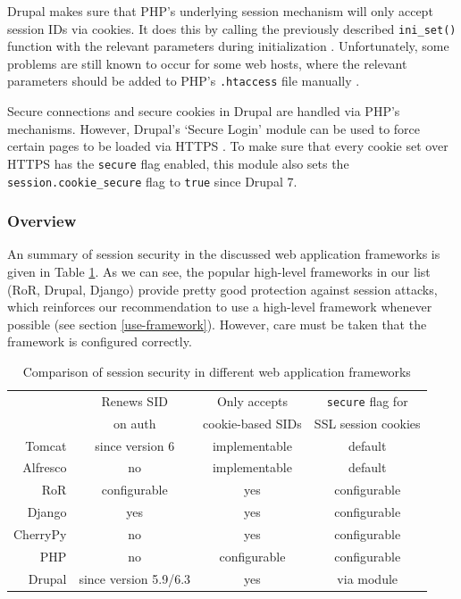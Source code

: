 Drupal makes sure that PHP's underlying session mechanism will only accept session IDs via cookies. It does this by calling the previously described \texttt{ini\_set()} function with the relevant parameters during initialization \cite{DrupalSettings}. Unfortunately, some problems are still known to occur for some web hosts, where the relevant parameters should be added to PHP's \texttt{.htaccess} file manually \cite{DrupalSIDurl}.

Secure connections and secure cookies in Drupal are handled via PHP's mechanisms. However, Drupal's `Secure Login' module can be used to force certain pages to be loaded via HTTPS \cite{DrupalSecureLogin}. To make sure that every cookie set over HTTPS has the \texttt{secure} flag enabled, this module also sets the \texttt{session.cookie\_secure} flag to \texttt{true} since Drupal 7.

\subsubsection{Overview}

An summary of session security in the discussed web application frameworks is given in Table \ref{tab:frameworks}. As we can see, the popular high-level frameworks in our list (RoR, Drupal, Django) provide pretty good protection against session attacks, which reinforces our recommendation to use a high-level framework whenever possible (see section \ref{use-framework}). However, care must be taken that the framework is configured correctly.

\begin{table}[htb]
	\centering
	\begin{tabular}{r|ccc}
		& Renews SID & Only accepts & \texttt{secure} flag for\\
		& on auth & cookie-based SIDs & SSL session cookies\\
		\hline
		Tomcat & since version 6 & implementable & default\\
		Alfresco & no & implementable & default\\
		RoR & configurable & yes & configurable\\
		Django & yes & yes & configurable\\
		CherryPy & no & yes & configurable\\
		PHP & no & configurable & configurable\\
		Drupal & since version 5.9/6.3 & yes & via module\\
	\end{tabular}
	\caption{Comparison of session security in different web application frameworks}
	\label{tab:frameworks}
\end{table}

